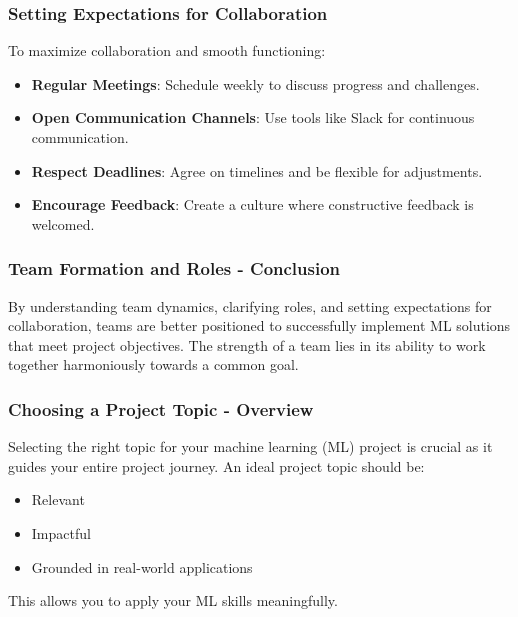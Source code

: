 \documentclass[aspectratio=169]{beamer}
\begin{document}
\begin{frame}[fragile]
    \frametitle{Setting Expectations for Collaboration}
    To maximize collaboration and smooth functioning:
    \begin{itemize}
        \item \textbf{Regular Meetings}: Schedule weekly to discuss progress and challenges.
        \item \textbf{Open Communication Channels}: Use tools like Slack for continuous communication.
        \item \textbf{Respect Deadlines}: Agree on timelines and be flexible for adjustments.
        \item \textbf{Encourage Feedback}: Create a culture where constructive feedback is welcomed.
    \end{itemize}
\end{frame}

\begin{frame}[fragile]
    \frametitle{Team Formation and Roles - Conclusion}
    By understanding team dynamics, clarifying roles, and setting expectations for collaboration, teams are better positioned to successfully implement ML solutions that meet project objectives. The strength of a team lies in its ability to work together harmoniously towards a common goal.
\end{frame}

\begin{frame}[fragile]
    \frametitle{Choosing a Project Topic - Overview}
    Selecting the right topic for your machine learning (ML) project is crucial as it guides your entire project journey. An ideal project topic should be:
    \begin{itemize}
        \item Relevant
        \item Impactful
        \item Grounded in real-world applications
    \end{itemize}
    This allows you to apply your ML skills meaningfully.
\end{frame}
\end{document}
